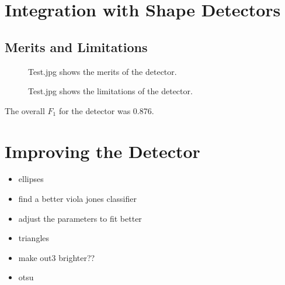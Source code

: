 \documentclass[a4paper]{article}
\begin{document}
\section{Integration with Shape Detectors}
\subsection{Merits and Limitations}

\begin{figure}[H]
  \centering
  \hfill
   \hfill
   \hfill
   \caption{Test.jpg shows the merits of the detector.}
\end{figure}

\begin{figure}[H]
  \centering
  \hfill
   \hfill
   \hfill
   \caption{Test.jpg shows the limitations of the detector.}
\end{figure}

The overall \(F_{1}\) for the detector was 0.876.

\begin{figure}[H]
  \centering
\end{figure}

\section{Improving the Detector}

\begin{itemize}
	\item ellipses
	\item find a better viola jones classifier
	\item adjust the parameters to fit better
	\item triangles
    \item make out3 brighter??
    \item otsu
\end{itemize}
\end{document}
